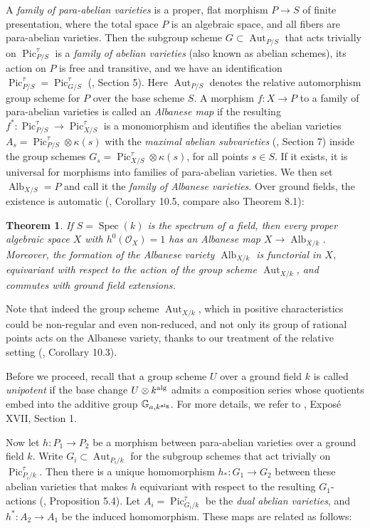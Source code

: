 \documentclass[oneside, 12pt]{amsart}
\newcommand\mylabel[1]{\label{#1}\marginpar{\vspace{-1ex}\medskip\medskip\footnotesize \tt #1}}
\renewcommand\mylabel[1]{\label{#1}}
\newtheorem{theorem}{Theorem}[section]
\theoremstyle{definition}
\theoremstyle{remark}
\newcommand{\GG}{\mathbb{G}}
\newcommand{\alg}{\text{\rm alg}}
\newcommand{\Alb}{\operatorname{Alb}}
\newcommand{\Aut}{\operatorname{Aut}}
\renewcommand{\O}{\mathscr{O}}
\newcommand{\Pic}{\operatorname{Pic}}
\newcommand{\ra}{\rightarrow}
\newcommand{\Spec}{\operatorname{Spec}}
\begin{document}
A \emph{family of para-abelian varieties} is a proper, flat morphism  $P\ra S$  of   finite presentation, where the total space $P$
is an algebraic space, and all fibers  are para-abelian varieties. 
Then the subgroup scheme $G\subset\Aut_{P/S}$ that acts trivially on $\Pic^\tau_{P/S}$   is a 
\emph{family of abelian varieties} (also known as abelian schemes),   its action on $P$ is free and transitive, and we have an identification $\Pic^\tau_{P/S}=\Pic^\tau_{G/S}$
(\cite{Laurent; Schroeer 2021}, Section 5). 
Here  $\Aut_{P/S}$ denotes the relative automorphism group scheme for $P$ over the base scheme $S$.
A morphism $f:X\ra P$ to a family of para-abelian varieties is called an \emph{Albanese map} if the resulting
$f^*:\Pic^\tau_{P/S}\ra \Pic_{X/S}^\tau$ is a monomorphism and identifies the abelian varieties $A_s=\Pic^\tau_{P/S}\otimes\kappa(s)$
with the \emph{maximal abelian subvarieties} (\cite{Laurent; Schroeer 2021}, Section 7)
inside the group schemes  $G_s=\Pic_{X/S}^\tau\otimes\kappa(s)$, for all points  $s\in S$.
If it exists, it is universal for morphisms into families of para-abelian varieties. 
We then set $\Alb_{X/S}=P$ and call it the \emph{family of Albanese varieties}.
Over ground fields,   the  existence is automatic (\cite{Laurent; Schroeer 2021}, Corollary 10.5, compare also \cite{Brochard 2021} Theorem 8.1):

\begin{theorem}
\mylabel{albanese for proper}
If $S=\Spec(k)$ is the spectrum of a field, then every proper algebraic space $X$ with $h^0(\O_X)=1$
has an Albanese map $X\ra\Alb_{X/k}$. Moreover, the formation of the Albanese variety $\Alb_{X/k}$ is functorial
in $X$,   equivariant with respect to the action of the group scheme $\Aut_{X/k}$, and commutes with ground field extensions.
\end{theorem}

Note that indeed the group scheme $\Aut_{X/k}$, which in positive characteristics could be non-regular and even non-reduced,
and not only its group of rational points  acts on
the Albanese variety, thanks to our treatment of the relative setting (\cite{Laurent; Schroeer 2021}, Corollary 10.3).

Before we proceed, recall that a group scheme $U$  over a ground field $k$
is called \emph{unipotent} if  the base change $U\otimes k^\alg$
admits  a composition series whose quotients embed into the additive group $\GG_{a,k^\alg}$. For more details,
we refer to \cite{SGA 3b}, Expos\'e XVII, Section 1.
 
Now let  $h:P_1\ra P_2$ be a morphism between para-abelian varieties over a ground field $k$.
Write $G_i\subset\Aut_{P_i/k}$ for the subgroup schemes that act trivially on  $\Pic^\tau_{P_i/k}$.
Then  there is 
a unique homomorphism $h_*:G_1\ra G_2$ between these abelian varieties that makes $h$ equivariant with respect to the resulting $G_1$-actions 
(\cite{Laurent; Schroeer 2021}, Proposition 5.4).
Let $A_i=\Pic^\tau_{G_i/k}$ be the \emph{dual abelian varieties}, and $h^*:A_2\ra A_1$ be the induced homomorphism.
These maps are related as follows:
\end{document}
